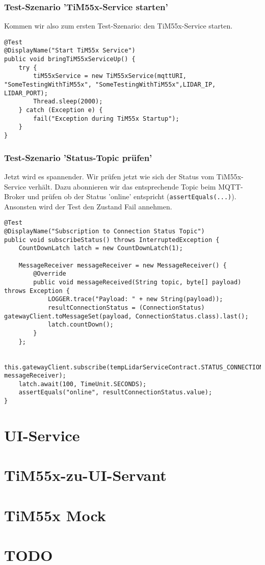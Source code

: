 \subsubsection{Test-Szenario 'TiM55x-Service starten'}
Kommen wir also zum ersten Test-Szenario: den TiM55x-Service starten.
\begin{lstlisting}[caption={TiM55x Startup-Test}]
@Test
@DisplayName("Start TiM55x Service")
public void bringTiM55xServiceUp() {
    try {
        tiM55xService = new TiM55xService(mqttURI, "SomeTestingWithTiM55x", "SomeTestingWithTiM55x",LIDAR_IP, LIDAR_PORT);
        Thread.sleep(2000);
    } catch (Exception e) {
        fail("Exception during TiM55x Startup");
    }
}
\end{lstlisting}

\subsubsection{Test-Szenario 'Status-Topic prüfen'}
Jetzt wird es spannender. Wir prüfen jetzt wie sich der Status vom TiM55x-Service verhält. Dazu abonnieren wir das entsprechende Topic beim MQTT-Broker und prüfen ob der Status 'online' entspricht (\verb|assertEquals(...)|). Ansonsten wird der Test den Zustand Fail annehmen.
\begin{lstlisting}
@Test
@DisplayName("Subscription to Connection Status Topic")
public void subscribeStatus() throws InterruptedException {
    CountDownLatch latch = new CountDownLatch(1);

    MessageReceiver messageReceiver = new MessageReceiver() {
        @Override
        public void messageReceived(String topic, byte[] payload) throws Exception {
            LOGGER.trace("Payload: " + new String(payload));
            resultConnectionStatus = (ConnectionStatus) gatewayClient.toMessageSet(payload, ConnectionStatus.class).last();
            latch.countDown();
        }
    };

    this.gatewayClient.subscribe(tempLidarServiceContract.STATUS_CONNECTION, messageReceiver);
    latch.await(100, TimeUnit.SECONDS);
    assertEquals("online", resultConnectionStatus.value);
}
\end{lstlisting}

\section{UI-Service}

\section{TiM55x-zu-UI-Servant}
\section{TiM55x Mock}
\label{chap:tim-mock}

\section{TODO}

